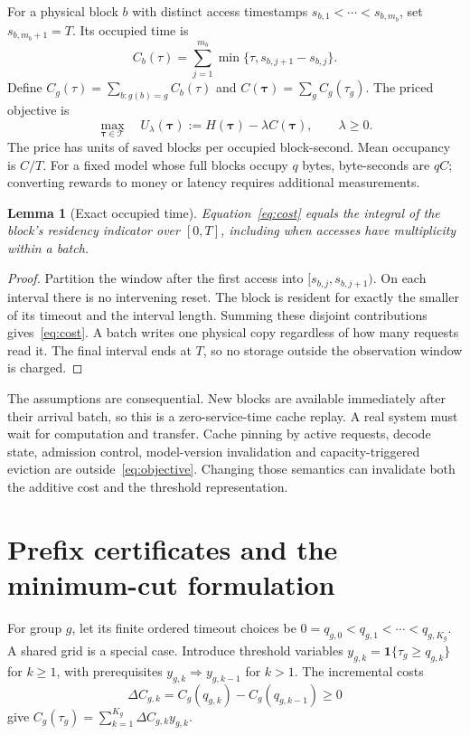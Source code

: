 \documentclass[11pt,a4paper]{article}
\newtheorem{lemma}[theorem]{Lemma}
\newcommand{\ind}{\mathbf{1}}
\newcommand{\U}{U_\lambda}
\begin{document}
For a physical block $b$ with distinct access timestamps
$s_{b,1}<\cdots<s_{b,m_b}$, set $s_{b,m_b+1}=T$. Its occupied time is
\begin{equation}
 C_b(\tau)=\sum_{j=1}^{m_b}\min\{\tau,s_{b,j+1}-s_{b,j}\}.
 \label{eq:cost}
\end{equation}
Define $C_g(\tau)=\sum_{b:g(b)=g}C_b(\tau)$ and
$C(\boldsymbol\tau)=\sum_g C_g(\tau_g)$. The priced objective is
\begin{equation}
 \max_{\boldsymbol\tau\in\mathcal T}\quad
 \U(\boldsymbol\tau):=H(\boldsymbol\tau)-\lambda C(\boldsymbol\tau),
 \qquad \lambda\geq0.\label{eq:objective}
\end{equation}
The price has units of saved blocks per occupied block-second. Mean occupancy
is $C/T$. For a fixed model whose full blocks occupy $q$ bytes, byte-seconds are
$qC$; converting rewards to money or latency requires additional measurements.

\begin{lemma}[Exact occupied time]\label{lem:cost}
Equation~\eqref{eq:cost} equals the integral of the block's residency indicator
over $[0,T]$, including when accesses have multiplicity within a batch.
\end{lemma}
\begin{proof}
Partition the window after the first access into
$[s_{b,j},s_{b,j+1})$. On each interval there is no intervening reset. The block
is resident for exactly the smaller of its timeout and the interval length.
Summing these disjoint contributions gives~\eqref{eq:cost}. A batch writes one
physical copy regardless of how many requests read it. The final interval ends
at $T$, so no storage outside the observation window is charged.
\end{proof}

The assumptions are consequential. New blocks are available immediately after
their arrival batch, so this is a zero-service-time cache replay. A real system
must wait for computation and transfer. Cache pinning by active requests, decode
state, admission control, model-version invalidation and capacity-triggered
eviction are outside~\eqref{eq:objective}. Changing those semantics can invalidate
both the additive cost and the threshold representation.

\section{Prefix certificates and the minimum-cut formulation}\label{sec:cut}
For group $g$, let its finite ordered timeout choices be
$0=q_{g,0}<q_{g,1}<\cdots<q_{g,K_g}$. A shared grid is a special case. Introduce
threshold variables $y_{g,k}=\ind\{\tau_g\geq q_{g,k}\}$ for $k\geq1$, with
prerequisites $y_{g,k}\Rightarrow y_{g,k-1}$ for $k>1$. The incremental costs
\begin{equation}
 \Delta C_{g,k}=C_g(q_{g,k})-C_g(q_{g,k-1})\geq0
\end{equation}
give $C_g(\tau_g)=\sum_{k=1}^{K_g}\Delta C_{g,k}y_{g,k}$.
\end{document}
